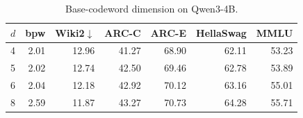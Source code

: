 \begin{table}[t]\centering\small
\caption{Base-codeword dimension on Qwen3-4B.}
\label{tab:dimension}
\begin{tabular}{lrrrrrr}\toprule
$d$ & bpw & Wiki2$\downarrow$ & ARC-C & ARC-E & HellaSwag & MMLU\\\midrule
4 & 2.01 & 12.96 & 41.27 & 68.90 & 62.11 & 53.23\\
5 & 2.02 & 12.74 & 42.50 & 69.46 & 62.78 & 53.89\\
6 & 2.04 & 12.18 & 42.92 & 70.12 & 63.16 & 55.01\\
8 & 2.59 & 11.87 & 43.27 & 70.73 & 64.28 & 55.71\\\bottomrule
\end{tabular}\end{table}
